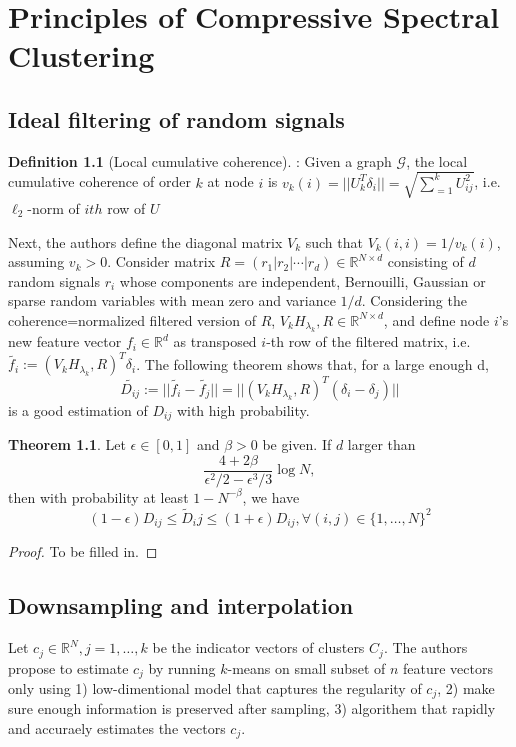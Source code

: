 \documentclass[10pt,a4paper, nocenter]{report}
\theoremstyle{definition}
\newtheorem{definition}{Definition}[section]
\newtheorem{theorem}{Theorem}
\newcommand{\norm}[1]{\lvert\lvert {#1} \rvert\rvert}
\begin{document}
	\chapter{Principles of Compressive Spectral Clustering}
	\section{Ideal filtering of random signals}

	\begin{definition}[Local cumulative coherence]: 
		Given a graph $\mathcal{G}$, the local cumulative coherence of order $k$ at node $i$ is $v_k(i) = \lvert \lvert U_k^T\delta_i\rvert \rvert = \sqrt{\sum_{=1}^k U_{ij}^2}$, i.e. $\ell_2$-norm of $i{th}$ row of $U$
	\end{definition}

	Next, the authors define the diagonal matrix $V_k$ such that $V_k(i,i) = 1/v_k(i)$, assuming $v_k > 0$. Consider matrix $R = (r_1|r_2|\cdots|r_d) \in \mathbb{R}^{N\times d}$ consisting of $d$ random signals $r_i$ whose components are independent, Bernouilli, Gaussian or sparse random variables with mean zero and variance $1/d$. Considering the coherence=normalized filtered version of $R$, $V_kH_{\lambda_k}, R \in \mathbb{R}^{N\times d}$, and define node $i$'s new feature vector $f_i \in \mathbb{R}^d$ as transposed $i$-th row of the filtered matrix, i.e. $\tilde{f_i} := (V_kH_{\lambda_k}, R)^T\delta_i$. The following theorem shows that, for a large enough d, $$\tilde{D_{ij}} := \norm{\tilde{f_i} - \tilde{f_j}} = \norm{(V_kH_{\lambda_k}, R)^T(\delta_i-\delta_j)}$$ is a good estimation of $D_{ij}$ with high probability.

	\begin{theorem}
		Let $\epsilon \in [0,1]$ and $\beta > 0$ be given. If $d$ larger than $$\frac{4+2\beta}{\epsilon^2/2 - \epsilon^3/3}\log N,$$ then with probability at least $1-N^{-\beta}$, we have $$(1-\epsilon)D_{ij} \le \tilde{D}_ij \le (1+\epsilon)D_{ij}, \forall (i,j) \in \{1,\dots,N\}^2 $$
	\end{theorem}
	\begin{proof}
		To be filled in.
	\end{proof}

	\section{Downsampling and interpolation}
	Let $c_j \in \mathbb{R}^N, j=1,\dots,k$ be the indicator vectors of clusters $C_j$. The authors propose to estimate $c_j$ by running $k$-means on small subset of $n$ feature vectors only using 1) low-dimentional model that captures the regularity of $c_j$, 2) make sure enough information is preserved after sampling, 3) algorithem that rapidly and accuraely estimates the vectors $c_j$. 
\end{document}
